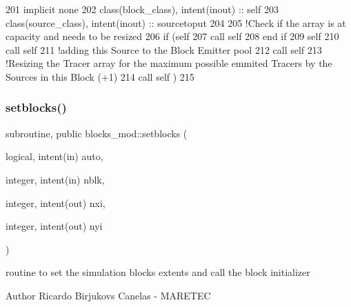 \begin{DoxyCode}
201     \textcolor{keywordtype}{implicit none}
202     \textcolor{keywordtype}{class}(block\_class), \textcolor{keywordtype}{intent(inout)} :: self
203     \textcolor{keywordtype}{class}(source\_class), \textcolor{keywordtype}{intent(inout)} :: sourcetoput
204     
205     \textcolor{comment}{!Check if the array is at capacity and needs to be resized}
206     \textcolor{keywordflow}{if} (self%
207         \textcolor{keyword}{call }self%
208 \textcolor{keywordflow}{    end if}
209     self%
210     \textcolor{keyword}{call }self%
211     \textcolor{comment}{!adding this Source to the Block Emitter pool}
212     \textcolor{keyword}{call }self%
213     \textcolor{comment}{!Resizing the Tracer array for the maximum possible emmited Tracers by the Sources in this Block (+1)}
214     \textcolor{keyword}{call }self%
      )
215 
\end{DoxyCode}
\mbox{\label{namespaceblocks__mod_a8f5a5d9e6cfd16cfd1b179092a204696}} 
\subsubsection{\texorpdfstring{setblocks()}{setblocks()}}
{\footnotesize\ttfamily subroutine, public blocks\+\_\+mod\+::setblocks (\begin{DoxyParamCaption}\item[{logical, intent(in)}]{auto,  }\item[{integer, intent(in)}]{nblk,  }\item[{integer, intent(out)}]{nxi,  }\item[{integer, intent(out)}]{nyi }\end{DoxyParamCaption})}



routine to set the simulation blocks extents and call the block initializer 

\begin{DoxyAuthor}{Author}
Ricardo Birjukovs Canelas -\/ M\+A\+R\+E\+T\+EC
\end{DoxyAuthor}

